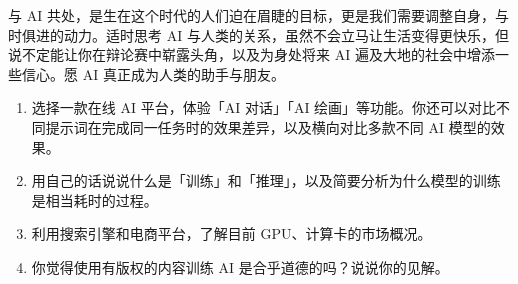 与 AI 共处，是生在这个时代的人们迫在眉睫的目标，更是我们需要调整自身，与时俱进的动力。适时思考 AI 与人类的关系，虽然不会立马让生活变得更快乐，但说不定能让你在辩论赛中崭露头角，以及为身处将来 AI 遍及大地的社会中增添一些信心。愿 AI 真正成为人类的助手与朋友。

\practice

\begin{enumerate}
  \item 选择一款在线 AI 平台，体验「AI 对话」「AI 绘画」等功能。你还可以对比不同提示词在完成同一任务时的效果差异，以及横向对比多款不同 AI 模型的效果。
  \item 用自己的话说说什么是「训练」和「推理」，以及简要分析为什么模型的训练是相当耗时的过程。
  \item 利用搜索引擎和电商平台，了解目前 GPU、计算卡的市场概况。
  \item 你觉得使用有版权的内容训练 AI 是合乎道德的吗？说说你的见解。
\end{enumerate}